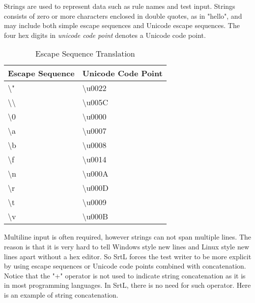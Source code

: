

Strings are used to represent data such as rule names and test input. Strings 
consists of zero or more characters enclosed in double quotes, as in "hello", 
and may include both simple escape sequences and Unicode escape sequences.
The four hex digits in \textit{unicode code point} denotes a Unicode code point.

\clearpage

\begin{table}[h]
    \centering
    \caption{Escape Sequence Translation}
        \begin{tabular}{|l|l|}
        \hline
        \textbf{Escape Sequence}     & \textbf{Unicode Code Point}  \\ \hline
        \textbackslash"              & \textbackslash u0022         \\ \hline
        \textbackslash\textbackslash & \textbackslash u005C         \\ \hline
        \textbackslash 0             & \textbackslash u0000         \\ \hline
        \textbackslash a             & \textbackslash u0007         \\ \hline
        \textbackslash b             & \textbackslash u0008         \\ \hline
        \textbackslash f             & \textbackslash u0014         \\ \hline
        \textbackslash n             & \textbackslash u000A         \\ \hline
        \textbackslash r             & \textbackslash u000D         \\ \hline
        \textbackslash t             & \textbackslash u0009         \\ \hline
        \textbackslash v             & \textbackslash u000B         \\ \hline
    \end{tabular}
\end{table}

Multiline input is often required, however strings can not span multiple lines. 
The reason is that it is very hard to tell Windows style new lines and Linux 
style new lines apart without a hex editor. So SrtL forces the test writer to be
more explicit by using escape sequences or Unicode code points combined with 
concatenation. Notice that the "+" operator is not used to indicate string 
concatenation as it is in most programming languages. In SrtL, there is no need
for such operator. Here is an example of string concatenation.

